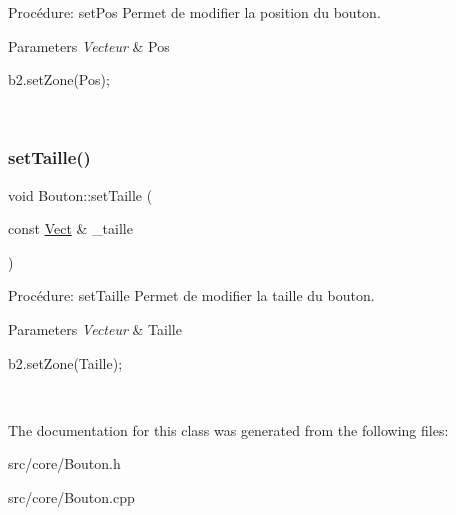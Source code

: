 Procédure\+: set\+Pos Permet de modifier la position du bouton. 


\begin{DoxyParams}{Parameters}
{\em Vecteur} & Pos 
\begin{DoxyCode}
b2.setZone(Pos);
\end{DoxyCode}
 \\
\hline
\end{DoxyParams}
\mbox{\label{classBouton_a972600e88d0a65431c27bec898fbba36}} 
\subsubsection{\texorpdfstring{set\+Taille()}{setTaille()}}
{\footnotesize\ttfamily void Bouton\+::set\+Taille (\begin{DoxyParamCaption}\item[{const \hyperlink{classVect}{Vect} \&}]{\+\_\+taille }\end{DoxyParamCaption})}



Procédure\+: set\+Taille Permet de modifier la taille du bouton. 


\begin{DoxyParams}{Parameters}
{\em Vecteur} & Taille 
\begin{DoxyCode}
b2.setZone(Taille);
\end{DoxyCode}
 \\
\hline
\end{DoxyParams}


The documentation for this class was generated from the following files\+:\begin{DoxyCompactItemize}
\item 
src/core/Bouton.\+h\item 
src/core/Bouton.\+cpp\end{DoxyCompactItemize}
